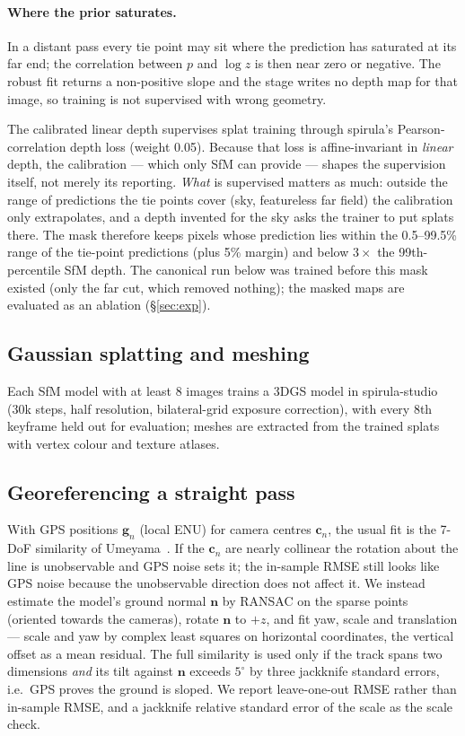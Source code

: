 \documentclass[10pt,a4paper,twocolumn]{article}
\begin{document}
\paragraph{Where the prior saturates.} In a distant pass every tie point may sit where the prediction has saturated at its far end; the correlation between $p$ and $\log z$ is then near zero or negative. The robust fit returns a non-positive slope and the stage writes no depth map for that image, so training is not supervised with wrong geometry.

The calibrated linear depth supervises splat training through spirula's Pearson-correlation depth loss (weight 0.05). Because that loss is affine-invariant in \emph{linear} depth, the calibration --- which only SfM can provide --- shapes the supervision itself, not merely its reporting. \emph{What} is supervised matters as much: outside the range of predictions the tie points cover (sky, featureless far field) the calibration only extrapolates, and a depth invented for the sky asks the trainer to put splats there. The mask therefore keeps pixels whose prediction lies within the 0.5--99.5\% range of the tie-point predictions (plus 5\% margin) and below $3\times$ the 99th-percentile SfM depth. The canonical run below was trained before this mask existed (only the far cut, which removed nothing); the masked maps are evaluated as an ablation (\S\ref{sec:exp}).

\subsection{Gaussian splatting and meshing}
Each SfM model with at least 8 images trains a 3DGS model in spirula-studio (30k steps, half resolution, bilateral-grid exposure correction), with every 8th keyframe held out for evaluation; meshes are extracted from the trained splats with vertex colour and texture atlases.

\subsection{Georeferencing a straight pass}\label{sec:georef}
With GPS positions $\mathbf{g}_n$ (local ENU) for camera centres $\mathbf{c}_n$, the usual fit is the 7-DoF similarity of Umeyama~\cite{umeyama1991}. If the $\mathbf{c}_n$ are nearly collinear the rotation about the line is unobservable and GPS noise sets it; the in-sample RMSE still looks like GPS noise because the unobservable direction does not affect it. We instead estimate the model's ground normal $\mathbf{n}$ by RANSAC on the sparse points (oriented towards the cameras), rotate $\mathbf{n}$ to $+z$, and fit yaw, scale and translation --- scale and yaw by complex least squares on horizontal coordinates, the vertical offset as a mean residual. The full similarity is used only if the track spans two dimensions \emph{and} its tilt against $\mathbf{n}$ exceeds $5^\circ$ by three jackknife standard errors, i.e.\ GPS proves the ground is sloped. We report leave-one-out RMSE rather than in-sample RMSE, and a jackknife relative standard error of the scale as the scale check.
\end{document}
